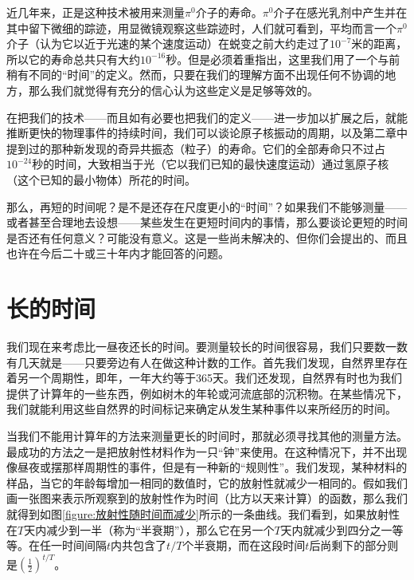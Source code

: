 近几年来，正是这种技术被用来测量$\pi^0$介子的寿命。$\pi^0$介子在感光乳剂中产生并在其中留下微细的踪迹，用显微镜观察这些踪迹时，人们就可看到，平均而言一个$\pi^0$介子（认为它以近于光速的某个速度运动）在蜕变之前大约走过了$ 10^{-7} $米的距离，所以它的寿命总共只有大约$ 10^{-16} $秒。但是必须着重指出，这里我们用了一个与前稍有不同的“时间”的定义。然而，只要在我们的理解方面不出现任何不协调的地方，那么我们就觉得有充分的信心认为这些定义是足够等效的。

在把我们的技术——而且如有必要也把我们的定义——进一步加以扩展之后，就能推断更快的物理事件的持续时间，我们可以谈论原子核振动的周期，以及第二章中提到过的那种新发现的奇异共振态（粒子）的寿命。它们的全部寿命只不过占$ 10^{-24} $秒的时间，大致相当于光（它以我们已知的最快速度运动）通过氢原子核（这个已知的最小物体）所花的时间。

那么，再短的时间呢？是不是还存在尺度更小的“时间”？如果我们不能够测量——或者甚至合理地去设想——某些发生在更短时间内的事情，那么要谈论更短的时间是否还有任何意义？可能没有意义。这是一些尚未解决的、但你们会提出的、而且也许在今后二十或三十年内才能回答的问题。


\section{长的时间}

我们现在来考虑比一昼夜还长的时间。要测量较长的时间很容易，我们只要数一数有几天就是——只要旁边有人在做这种计数的工作。首先我们发现，自然界里存在着另一个周期性，即年，一年大约等于365天。我们还发现，自然界有时也为我们提供了计算年的一些东西，例如树木的年轮或河流底部的沉积物。在某些情况下，我们就能利用这些自然界的时间标记来确定从发生某种事件以来所经历的时间。

当我们不能用计算年的方法来测量更长的时间时，那就必须寻找其他的测量方法。最成功的方法之一是把放射性材料作为一只“钟”来使用。在这种情况下，并不出现像昼夜或摆那样周期性的事件，但是有一种新的“规则性”。我们发现，某种材料的样品，当它的年龄每增加一相同的数值时，它的放射性就减少一相同的。假如我们画一张图来表示所观察到的放射性作为时间（比方以天来计算）的函数，那么我们就得到如图\ref{figure:放射性随时间而减少}所示的一条曲线。我们看到，如果放射性在$ T $天内减少到一半（称为“半衰期”），那么它在另一个$ T $天内就减少到四分之一等等。在任一时间间隔$ t $内共包含了$ t/T $个半衰期，而在这段时间$ t $后尚剩下的部分则是$ (\tfrac{1}{2})^{t/T} $。

